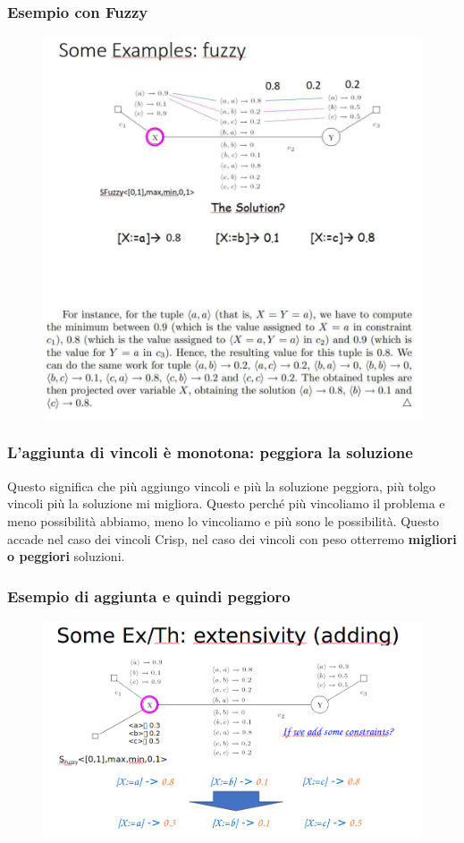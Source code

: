 \subsubsection{Esempio con Fuzzy}
\begin{figure}[htp]
    \centering
    \includegraphics[width=14cm, keepaspectratio]{img/Cap4/fuzzy.png}
\end{figure}

\newpage
\subsubsection{L'aggiunta di vincoli è monotona: peggiora la soluzione}
Questo significa che più aggiungo vincoli e più la soluzione peggiora, più tolgo
vincoli più la soluzione mi migliora. Questo perché più vincoliamo il problema e
meno possibilità abbiamo, meno lo vincoliamo e più sono le possibilità. Questo
accade nel caso dei vincoli Crisp, nel caso dei vincoli con peso otterremo
\textbf{migliori o peggiori} soluzioni.
\subsubsection{Esempio di aggiunta e quindi peggioro}
\begin{figure}[htp]
    \centering
    \includegraphics[width=12.5cm, keepaspectratio]{img/Cap4/worst2.png}
\end{figure}

